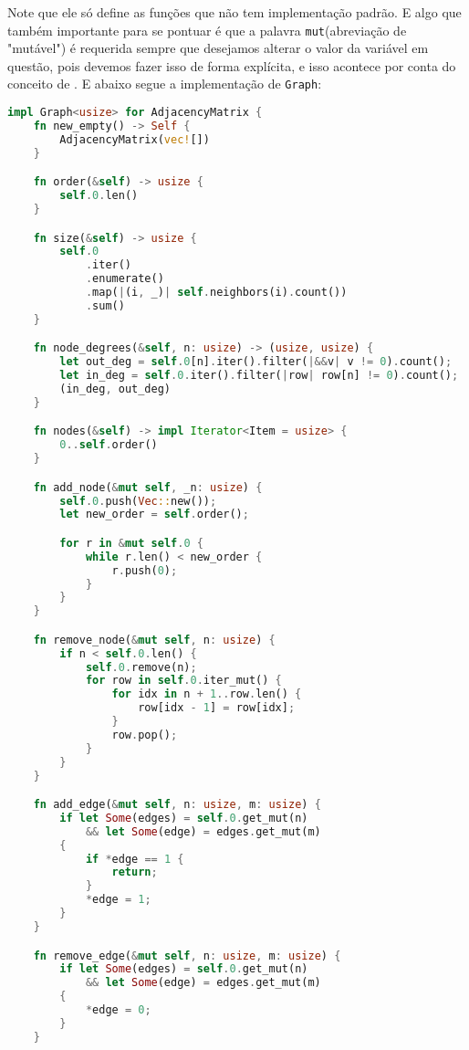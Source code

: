 Note que ele só define as funções que não tem implementação padrão. E algo que também importante para se pontuar é que a palavra \texttt{mut}(abreviação de "mutável") é requerida sempre que desejamos alterar o valor da variável em questão, pois devemos fazer isso de forma explícita, e isso acontece por conta do conceito de \cite{ownership}. E abaixo segue a implementação de \texttt{Graph}:

\begin{lstlisting}[language=Rust, caption={Implementação de Graph na Estrutura de Dados Matriz de Adjacência}, label=list:impl_adj_mat_g]
impl Graph<usize> for AdjacencyMatrix {
    fn new_empty() -> Self {
        AdjacencyMatrix(vec![])
    }

    fn order(&self) -> usize {
        self.0.len()
    }

    fn size(&self) -> usize {
        self.0
            .iter()
            .enumerate()
            .map(|(i, _)| self.neighbors(i).count())
            .sum()
    }

    fn node_degrees(&self, n: usize) -> (usize, usize) {
        let out_deg = self.0[n].iter().filter(|&&v| v != 0).count();
        let in_deg = self.0.iter().filter(|row| row[n] != 0).count();
        (in_deg, out_deg)
    }

    fn nodes(&self) -> impl Iterator<Item = usize> {
        0..self.order()
    }

    fn add_node(&mut self, _n: usize) {
        self.0.push(Vec::new());
        let new_order = self.order();

        for r in &mut self.0 {
            while r.len() < new_order {
                r.push(0);
            }
        }
    }

    fn remove_node(&mut self, n: usize) {
        if n < self.0.len() {
            self.0.remove(n);
            for row in self.0.iter_mut() {
                for idx in n + 1..row.len() {
                    row[idx - 1] = row[idx];
                }
                row.pop();
            }
        }
    }

    fn add_edge(&mut self, n: usize, m: usize) {
        if let Some(edges) = self.0.get_mut(n)
            && let Some(edge) = edges.get_mut(m)
        {
            if *edge == 1 {
                return;
            }
            *edge = 1;
        }
    }

    fn remove_edge(&mut self, n: usize, m: usize) {
        if let Some(edges) = self.0.get_mut(n)
            && let Some(edge) = edges.get_mut(m)
        {
            *edge = 0;
        }
    }


\end{lstlisting}
